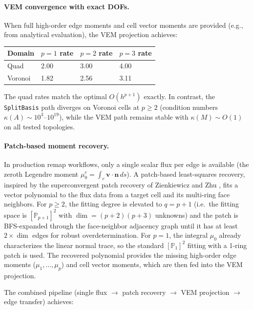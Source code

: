 \documentclass[11pt]{article}
\begin{document}
\paragraph{VEM convergence with exact DOFs.}
When full high-order edge moments and cell vector moments are provided
(e.g., from analytical evaluation), the VEM projection achieves:

\begin{center}
\begin{tabular}{llll}
\toprule
Domain & \(p=1\) rate & \(p=2\) rate & \(p=3\) rate \\
\midrule
Quad   & 2.00 & 3.00 & 4.00 \\
Voronoi & 1.82 & 2.56 & 3.11 \\
\bottomrule
\end{tabular}
\end{center}

The quad rates match the optimal \(O(h^{p+1})\) exactly.  In contrast, the
\texttt{SplitBasis} path diverges on Voronoi cells at \(p\ge2\) (condition
numbers \(\kappa(A)\sim10^3\)--\(10^{19}\)), while the VEM path remains stable
with \(\kappa(M)\sim O(1)\) on all tested topologies.

\paragraph{Patch-based moment recovery.}
In production remap workflows, only a single scalar flux per edge is available
(the zeroth Legendre moment \(\mu_0^e = \int_e \mathbf{v}\cdot\mathbf{n}\,ds\)).
A patch-based least-squares recovery, inspired by the superconvergent patch
recovery of Zienkiewicz and Zhu \cite{ZienkiewiczZhu1992a,ZienkiewiczZhu1992b},
fits a vector polynomial to the flux data from a target cell and its
multi-ring face neighbors.  For \(p\ge2\), the fitting degree is elevated
to \(q=p+1\) (i.e.\ the fitting space is \([\mathbb{P}_{p+1}]^2\) with
\(\dim=(p+2)(p+3)\) unknowns) and the patch is BFS-expanded through the
face-neighbor adjacency graph until it has at least \(2\times\dim\) edges
for robust overdetermination.  For \(p=1\), the integral \(\mu_0\) already
characterizes the linear normal trace, so the standard \([\mathbb{P}_1]^2\)
fitting with a 1-ring patch is used.  The recovered polynomial provides
the missing high-order edge moments (\(\mu_1,\ldots,\mu_p\)) and cell vector
moments, which are then fed into the VEM projection.

The combined pipeline (single flux \(\to\) patch recovery \(\to\) VEM projection
\(\to\) edge transfer) achieves:
\end{document}
